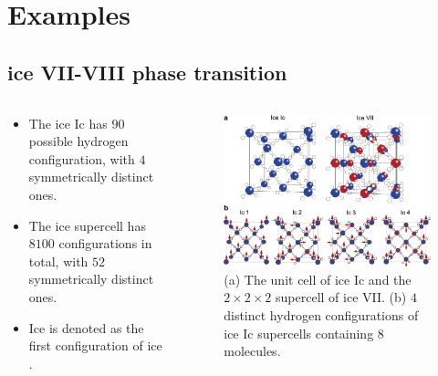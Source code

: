 \documentclass[13pt,aspectratio=169]{beamer}
\newcommand*{\RMN}[1]{\uppercase\expandafter{\romannumeral#1}}
\begin{document}
\section{Examples}

\subsection{ice VII-VIII phase transition}
\begin{frame}[allowframebreaks]{\subsecname}
	\begin{columns}
		\begin{column}{0.5\textwidth}
			\begin{itemize}
				\item The ice Ic has $90$ possible hydrogen configuration, with $4$ symmetrically distinct ones.
				\item The ice \RMN{7} supercell has $8100$ configurations in total, with $52$ symmetrically distinct ones.
				\item Ice \RMN{8} is denoted as the first configuration of ice \RMN{7}.
			\end{itemize}
		\end{column}

		\begin{column}{0.45\textwidth}
			\vspace{\topsep}
			\begin{figure}
				\includegraphics[width=\columnwidth]{images/ice7}%
				\caption{(a) The unit cell of ice Ic and the $2\times 2\times 2$ supercell of ice VII.
					(b) $4$ distinct hydrogen configurations of ice Ic supercells containing $8$ molecules.}
			\end{figure}
		\end{column}
	\end{columns}


\end{frame}
\end{document}
